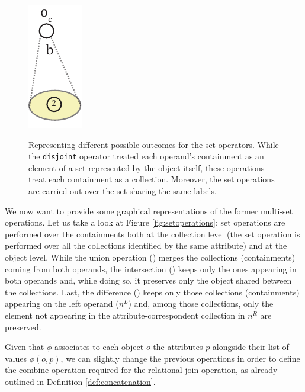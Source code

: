 \begin{figure}[!t]
\begin{minipage}[t]{0.3\textwidth}
	\label{fig:setintersection}
\end{minipage}\begin{minipage}[t]{0.1\textwidth}
	\centering
	\includegraphics[scale=0.8]{fig/05language/05setop_difference.pdf}
	\label{fig:setdifference}
\end{minipage}
	\caption{Representing different possible outcomes for the set operators. While the \texttt{disjoint} operator treated each operand's containment as an element of a set represented by the object itself, these operations treat each containment as a collection. Moreover, the set operations are carried out over the set sharing the same labels.}
	\label{fig:setoperations}
\end{figure}


\begin{example}
We now want to provide some graphical representations of the former multi-set operations. Let us take a look at Figure \vref{fig:setoperations}: set operations are performed over the containments both at the collection level (the set operation is performed over all the collections identified by the same attribute) and at the object level. While the union operation () merges the collections (containments) coming from both operands, the intersection () keeps only the ones appearing in both operands and, while doing so, it preserves only the object shared between the collections. Last, the difference () keeps only those collections (containments) appearing on the left operand ($n^L$) and, among those collections, only the element not appearing in the attribute-correspondent collection in $n^R$ are preserved.
\end{example}

Given that $\phi$ associates to each object $o$ the attributes $p$ alongside their list of values $\phi(o,p)$, we can slightly change the previous operations in order to define the combine operation required for the relational join operation, as already outlined in Definition \vref{def:concatenation}.

